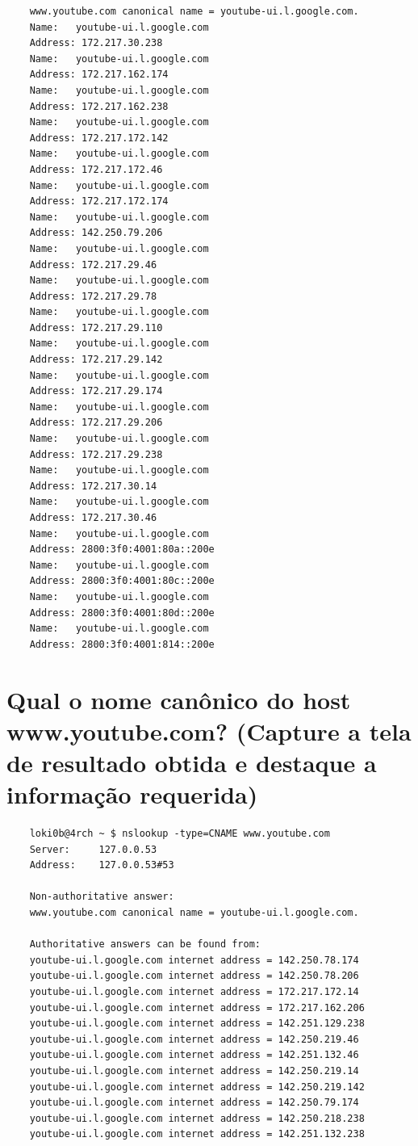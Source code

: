 \begin{parts}
\begin{solution}
\begin{verbatim}
    www.youtube.com	canonical name = youtube-ui.l.google.com.
    Name:	youtube-ui.l.google.com
    Address: 172.217.30.238
    Name:	youtube-ui.l.google.com
    Address: 172.217.162.174
    Name:	youtube-ui.l.google.com
    Address: 172.217.162.238
    Name:	youtube-ui.l.google.com
    Address: 172.217.172.142
    Name:	youtube-ui.l.google.com
    Address: 172.217.172.46
    Name:	youtube-ui.l.google.com
    Address: 172.217.172.174
    Name:	youtube-ui.l.google.com
    Address: 142.250.79.206
    Name:	youtube-ui.l.google.com
    Address: 172.217.29.46
    Name:	youtube-ui.l.google.com
    Address: 172.217.29.78
    Name:	youtube-ui.l.google.com
    Address: 172.217.29.110
    Name:	youtube-ui.l.google.com
    Address: 172.217.29.142
    Name:	youtube-ui.l.google.com
    Address: 172.217.29.174
    Name:	youtube-ui.l.google.com
    Address: 172.217.29.206
    Name:	youtube-ui.l.google.com
    Address: 172.217.29.238
    Name:	youtube-ui.l.google.com
    Address: 172.217.30.14
    Name:	youtube-ui.l.google.com
    Address: 172.217.30.46
    Name:	youtube-ui.l.google.com
    Address: 2800:3f0:4001:80a::200e
    Name:	youtube-ui.l.google.com
    Address: 2800:3f0:4001:80c::200e
    Name:	youtube-ui.l.google.com
    Address: 2800:3f0:4001:80d::200e
    Name:	youtube-ui.l.google.com
    Address: 2800:3f0:4001:814::200e
    \end{verbatim}
    \end{solution}

    \part{Qual o nome canônico do host www.youtube.com? (Capture a tela de resultado obtida e destaque a informação requerida)}
    \begin{solution}
    \begin{verbatim}
    loki0b@4rch ~ $ nslookup -type=CNAME www.youtube.com
    Server:		127.0.0.53
    Address:	127.0.0.53#53

    Non-authoritative answer:
    www.youtube.com	canonical name = youtube-ui.l.google.com.

    Authoritative answers can be found from:
    youtube-ui.l.google.com	internet address = 142.250.78.174
    youtube-ui.l.google.com	internet address = 142.250.78.206
    youtube-ui.l.google.com	internet address = 172.217.172.14
    youtube-ui.l.google.com	internet address = 172.217.162.206
    youtube-ui.l.google.com	internet address = 142.251.129.238
    youtube-ui.l.google.com	internet address = 142.250.219.46
    youtube-ui.l.google.com	internet address = 142.251.132.46
    youtube-ui.l.google.com	internet address = 142.250.219.14
    youtube-ui.l.google.com	internet address = 142.250.219.142
    youtube-ui.l.google.com	internet address = 142.250.79.174
    youtube-ui.l.google.com	internet address = 142.250.218.238
    youtube-ui.l.google.com	internet address = 142.251.132.238
    \end{verbatim}
    \end{solution}


\end{parts}
